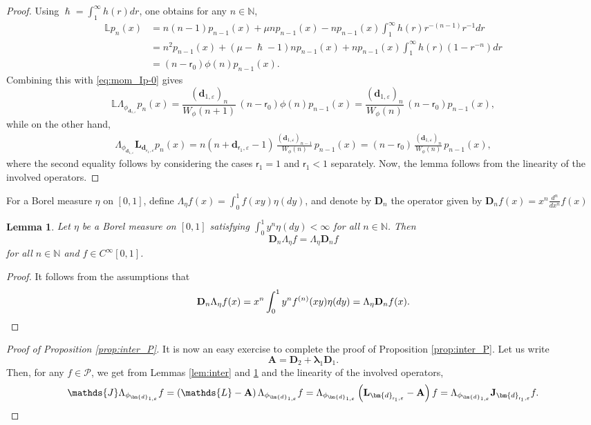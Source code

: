 \documentclass[10pt]{amsart}
\let\epsilon\varepsilon
\theoremstyle{plain}
\newtheorem{lemma}[theorem]{Lemma}
\theoremstyle{definition}
\newcommand{\N}{\mathbb{N}}
\newcommand{\Poly}{\mathscr{P}}
\newcommand{\calL}{\mathds{L}}
\newcommand{\calLd}{\mathbf{L}}
\newcommand{\calJ}{\mathds{J}}
\newcommand{\calJd}{\mathbf{J}}
\newcommand{\dpt}{\bm{d}_{\vat,\epsilon}}
\newcommand{\dz}{{\bm{d}}_{1,\epsilon}}
\newcommand{\lam}{{\bm{\lambda}_1}}
\newcommand{\tet}{{\mathsf{r}_0}}
\newcommand{\vat}{{\mathsf{r}_1}}
\let\h\hslash
\let\mo\mu
\begin{document}
\begin{proof}
Using $\h = \int_1^\infty h(r)dr$, one obtains for any $n\in \N$,
\begin{align*}
\calL p_n(x) &= n(n-1)p_{n-1}(x)+ \mo n p_{n-1}(x)-np_{n-1}(x)\int_1^\infty h(r) r^{-(n-1)} r^{-1}dr \nonumber \\
&= n^2 p_{n-1}(x) + (\mo-\h-1)np_{n-1}(x)+np_{n-1}(x)\int_1^\infty h(r) (1-r^{-n}) dr \nonumber \\
&= (n-\tet)\phi(n)p_{n-1}(x).
\end{align*}
Combining this with \eqref{eq:mom_Ip-0} gives
\begin{equation*}
\calL \Lambda_{\phi_{\dz}}p_n(x) = \frac{(\dz)_n}{W_{\phi}(n+1)}\, (n-\tet)\phi(n) p_{n-1}(x) = \frac{(\dz)_n}{W_{\phi}(n)}\, (n-\tet)p_{n-1}(x),
\end{equation*}
while on the other hand,
\begin{align*}
\Lambda_{\phi_{\dz}} \calLd_{\dpt} p_n(x) = n(n+\dpt-1)\,\frac{(\dz)_{n-1}}{W_{\phi}(n)}\, p_{n-1}(x) = (n-\tet)\,\frac{(\dz)_n}{W_{\phi}(n)}\,p_{n-1}(x),
\end{align*}
where the second equality follows by considering the cases $\vat=1$ and $\vat < 1$ separately. Now, the lemma
follows from the linearity of the involved operators.
\end{proof}

For a Borel measure $\eta$ on $[0,1]$, define $\Lambda_{\eta}f(x)=\int_{0}^{1}f(xy)\eta(dy)$, and denote by $\mathbf{D}_n$ the operator given by $\mathbf{D}_n f(x) = x^n \frac{d^n}{dx^n} f(x)$

\begin{lemma} \label{lem:op-com}
Let $\eta$ be a Borel measure on $[0,1]$ satisfying
$\int_{0}^{1}y^n \eta(dy)<\infty$ for all $n \in \mathbb{N}$.
Then
\begin{equation*}
\mathbf{D}_{n} \Lambda_{\eta} f = \Lambda_{\eta} \mathbf{D}_{n} f
\end{equation*}
for all $n\in \N$ and $f \in C^\infty[0,1]$.
\end{lemma}

\begin{proof}
It follows from the assumptions that
\[
\mathbf{D}_{n} \Lambda_{\eta} f(x) = x^n \int_0^1 y^n f^{(n)}(xy) \eta (dy) = \Lambda_{\eta} \mathbf{D}_{n} f(x).\qedhere
\]
\end{proof}

\begin{proof}[Proof of Proposition \ref{prop:inter_P}]
It is now an easy exercise to complete the proof of Proposition \ref{prop:inter_P}. Let us write
\begin{equation*}
\mathbf{A}= \mathbf{D}_{2}+ \lam \mathbf{D}_{1}.
\end{equation*}
Then, for any $f \in \Poly$, we get from Lemmas \ref{lem:inter} and \ref{lem:op-com}
and the linearity of the involved operators,
\begin{equation*}
\calJ \Lambda_{\phi_{\dz}} f = \left( \calL -\mathbf{A}\right) \Lambda_{\phi_{\dz}}f = \Lambda_{\phi_{\dz}}\left( \calLd_{\dpt} -\mathbf{A}\right) f
= \Lambda_{\phi_{\dz}} \calJd_{\dpt} f.\qedhere
\end{equation*}
\end{proof}
\end{document}
